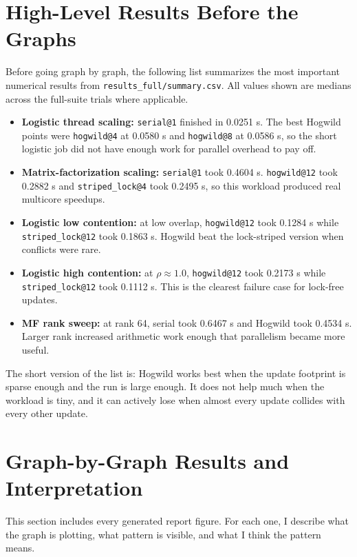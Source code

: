 \documentclass[11pt]{article}
\begin{document}
\section{High-Level Results Before the Graphs}

Before going graph by graph, the following list summarizes the most important numerical results from \texttt{results\_full/summary.csv}. All values shown are medians across the full-suite trials where applicable.

\begin{itemize}
  \item \textbf{Logistic thread scaling:} \texttt{serial@1} finished in 0.0251 s. The best Hogwild points were \texttt{hogwild@4} at 0.0580 s and \texttt{hogwild@8} at 0.0586 s, so the short logistic job did not have enough work for parallel overhead to pay off.
  \item \textbf{Matrix-factorization scaling:} \texttt{serial@1} took 0.4604 s. \texttt{hogwild@12} took 0.2882 s and \texttt{striped\_lock@4} took 0.2495 s, so this workload produced real multicore speedups.
  \item \textbf{Logistic low contention:} at low overlap, \texttt{hogwild@12} took 0.1284 s while \texttt{striped\_lock@12} took 0.1863 s. Hogwild beat the lock-striped version when conflicts were rare.
  \item \textbf{Logistic high contention:} at \(\rho \approx 1.0\), \texttt{hogwild@12} took 0.2173 s while \texttt{striped\_lock@12} took 0.1112 s. This is the clearest failure case for lock-free updates.
  \item \textbf{MF rank sweep:} at rank 64, serial took 0.6467 s and Hogwild took 0.4534 s. Larger rank increased arithmetic work enough that parallelism became more useful.
\end{itemize}

The short version of the list is: Hogwild works best when the update footprint is sparse enough and the run is large enough. It does not help much when the workload is tiny, and it can actively lose when almost every update collides with every other update.

\section{Graph-by-Graph Results and Interpretation}

This section includes every generated report figure. For each one, I describe what the graph is plotting, what pattern is visible, and what I think the pattern means.
\end{document}
